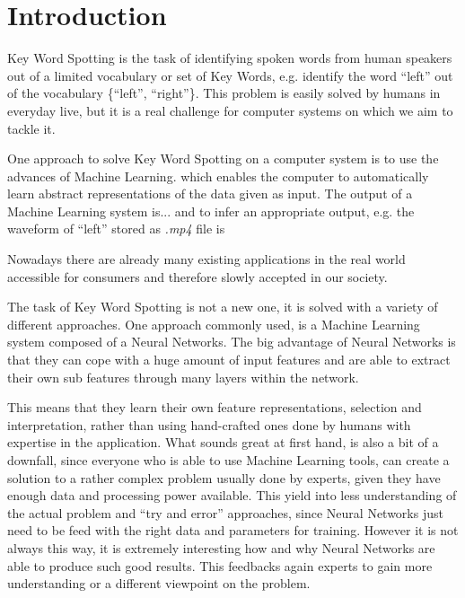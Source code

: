 \chapter{Introduction}
Key Word Spotting is the task of identifying spoken words from human speakers out of a limited vocabulary or set of Key Words, e.g. identify the word \enquote{left} out of the vocabulary \{\enquote{left}, \enquote{right}\}. This problem is easily solved by humans in everyday live, but it is a real challenge for computer systems on which we aim to tackle it.

One approach to solve Key Word Spotting on a computer system is to use the advances of Machine Learning. which enables the computer to automatically learn abstract representations of the data given as input. 
The output of a Machine Learning system is...
and to infer an appropriate output, e.g. the waveform of \enquote{left} stored as \textit{.mp4} file is

Nowadays there are already many existing applications in the real world accessible for consumers and therefore slowly accepted in our society.

The task of Key Word Spotting is not a new one, it is solved with a variety of different approaches. 
One approach commonly used, is a Machine Learning system composed of a Neural Networks.
The big advantage of Neural Networks is that they can cope with a huge amount of input features and are able to extract their own sub features through many layers within the network.

This means that they learn their own feature representations, selection and interpretation, rather than using hand-crafted ones done by humans with expertise in the application. 
What sounds great at first hand, is also a bit of a downfall, since everyone who is able to use Machine Learning tools, can create a solution to a rather complex problem usually done by experts, given they have enough data and processing power available.
This yield into less understanding of the actual problem and \enquote{try and error} approaches, since Neural Networks just need to be feed with the right data and parameters for training.
However it is not always this way, it is extremely interesting how and why Neural Networks are able to produce such good results. 
This feedbacks again experts to gain more understanding or a different viewpoint on the problem.


